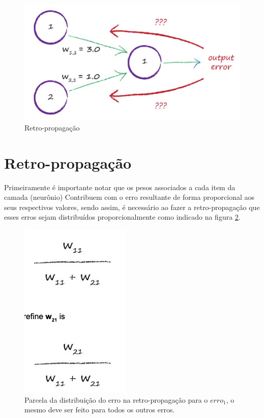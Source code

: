 \begin{apendicesenv}
		\begin{figure}[H]
			\centering
			\caption{Retro-propagação}
			\label{fig:backpropagation}
			\includegraphics[width=0.7\linewidth]{images/TEMPbackpropagation}
		\end{figure}
	
	\section{Retro-propagação}
		\par Primeiramente é importante notar que os pesos associados a cada item da camada (neurônio) Contribuem com o erro resultante de forma proporcional aos seus respectivos valores, sendo assim, é necessário ao fazer a retro-propagação que esses erros sejam distribuídos proporcionalmente como indicado na figura \ref{fig:backpropagationErrors}.
		
		\begin{figure}[H]
			\centering
			\caption{Parcela da distribuição do erro na retro-propagação para o $erro_1$, o mesmo deve ser feito para todos os outros erros.}
			\label{fig:backpropagationErrors}
			\includegraphics[width=0.4\linewidth]{images/TEMPbackpropagationErros}
		\end{figure}
		

\end{apendicesenv}
